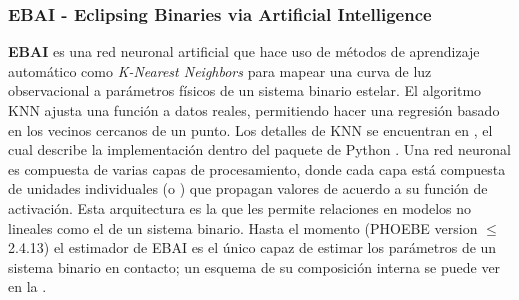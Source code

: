 \subsubsection{EBAI - Eclipsing Binaries via Artificial Intelligence} \label{intro:phoebe:problema_inverso:ebai}
\textbf{EBAI} es una red neuronal artificial que hace uso de métodos de
aprendizaje automático como \textit{K-Nearest Neighbors} para mapear una curva
de luz observacional a parámetros físicos de un sistema binario estelar. El
algoritmo KNN ajusta una función a datos reales, permitiendo hacer una regresión
basado en los vecinos cercanos de un punto. Los detalles de KNN se encuentran en
, el cual describe la implementación
dentro del paquete de Python . Una red neuronal es compuesta
de varias capas de procesamiento, donde cada capa está compuesta de unidades
individuales (o ) que propagan valores de acuerdo a su función
de activación. Esta arquitectura es la que les permite 
relaciones en modelos no lineales como el de un sistema binario. Hasta el
momento (PHOEBE version $\leq$2.4.13) el estimador de EBAI es el único capaz de
estimar los parámetros de un sistema binario en contacto; un esquema de su
composición interna se puede ver en la .

